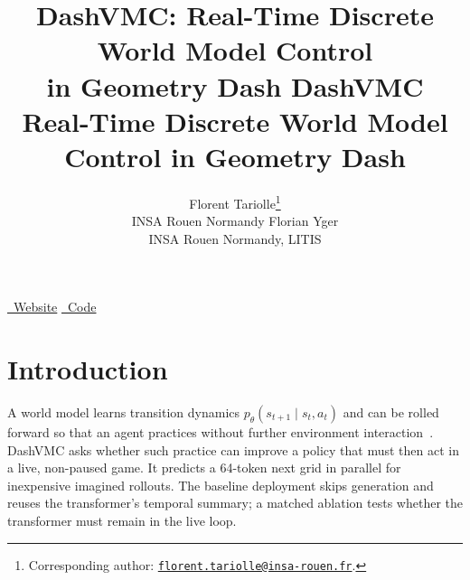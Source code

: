 \ifdashvmcworkshop
  \title{DashVMC: Real-Time Discrete World Model Control\\in Geometry Dash}
  \author{%
    Florent Tariolle\thanks{Corresponding author: \href{mailto:florent.tariolle@insa-rouen.fr}{\texttt{florent.tariolle@insa-rouen.fr}}.} \\
    INSA Rouen Normandy
    \And
    Florian Yger \\
    INSA Rouen Normandy, LITIS
  }
\else
  \title{%
    DashVMC\\[0.1em]
    {\large\color{black!70}Real-Time Discrete World Model Control in Geometry Dash}%
  }
  \renewcommand\authorlist{%
    \vskip 0.4cm
    {\fairtitlefont\bfseries Contributors}\\
    Florent Tariolle\textsuperscript{1},
    Florian Yger\textsuperscript{1,2}\\[0.5em]
    {\small\fairtitlefont\bfseries
      \textsuperscript{1}INSA Rouen Normandy\quad
      \textsuperscript{2}LITIS}%
  }
  \abstract{\dashvmcabstract}
\fi



\maketitle

\ifdashvmcworkshop
  \vspace{-0.12in}
  {\centering\hypersetup{urlcolor=black}
    \href{https://tariolle.github.io/dash-vmc/}{\faGlobe~Website}\qquad
    \href{https://github.com/Tariolle/dash-vmc}{\faGithub~Code}\par}
  \vspace{0.1in}

  \begin{abstract}
    \dashvmcabstract
  \end{abstract}
\fi

\section{Introduction}
\label{sec:intro}

A world model learns transition dynamics \(p_\theta(s_{t+1}\mid s_t,a_t)\) and can be rolled forward so that an agent practices without further environment interaction~\citep{lecun2022path,ha2018world}.
DashVMC asks whether such practice can improve a policy that must then act in a live, non-paused game.
It predicts a 64-token next grid in parallel for inexpensive imagined rollouts.
The baseline deployment skips generation and reuses the transformer's temporal summary; a matched ablation tests whether the transformer must remain in the live loop.

